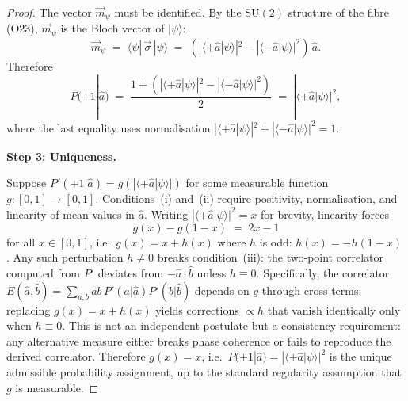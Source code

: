 \begin{proof}
  The vector $\vec{m}_\psi$ must be identified.
  By the $\mathrm{SU}(2)$ structure of the fibre (O23),
  $\vec{m}_\psi$ is the Bloch vector of $|\psi\rangle$:
  \begin{equation}
    \vec{m}_\psi
    \;=\;
    \langle\psi|\,\vec{\sigma}\,|\psi\rangle
    \;=\;
    (|\langle +\hat{a}|\psi\rangle|^2 - |\langle -\hat{a}|\psi\rangle|^2)\,\hat{a}.
  \end{equation}
  Therefore
  \begin{equation}
    P(+1|\hat{a})
    \;=\;
    \frac{1 + (|\langle +\hat{a}|\psi\rangle|^2 - |\langle -\hat{a}|\psi\rangle|^2)}{2}
    \;=\;
    |\langle +\hat{a}|\psi\rangle|^2,
  \end{equation}
  where the last equality uses normalisation
  $|\langle +\hat{a}|\psi\rangle|^2 + |\langle -\hat{a}|\psi\rangle|^2 = 1$.

  \textbf{Step 3: Uniqueness.}

  Suppose $P'(+1|\hat{a}) = g(|\langle +\hat{a}|\psi\rangle|)$ for some
  measurable function $g: [0,1] \to [0,1]$.
  Conditions~(i) and~(ii) require positivity, normalisation, and linearity
  of mean values in $\hat{a}$.
  Writing $|\langle +\hat{a}|\psi\rangle|^2 = x$ for brevity, linearity forces
  \begin{equation}
    g(x) - g(1-x) \;=\; 2x - 1
  \end{equation}
  for all $x \in [0,1]$, i.e.\ $g(x) = x + h(x)$ where $h$ is odd:
  $h(x) = -h(1-x)$.
  Any such perturbation $h \neq 0$ breaks condition~(iii): the two-point
  correlator computed from $P'$ deviates from $-\hat{a}\cdot\hat{b}$ unless
  $h \equiv 0$.
  Specifically, the correlator $E(\hat{a},\hat{b}) = \sum_{a,b} ab\,P'(a|\hat{a})P'(b|\hat{b})$
  depends on $g$ through cross-terms; replacing $g(x) = x + h(x)$ yields
  corrections $\propto h$ that vanish identically only when $h \equiv 0$.
  This is not an independent postulate but a consistency requirement:
  any alternative measure either breaks phase coherence or fails to reproduce
  the derived correlator.
  Therefore $g(x) = x$, i.e.\ $P(+1|\hat{a}) = |\langle +\hat{a}|\psi\rangle|^2$
  is the unique admissible probability assignment,
  up to the standard regularity assumption that $g$ is measurable.
\end{proof}

